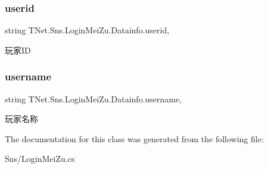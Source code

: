 \subsubsection{\texorpdfstring{userid}{userid}}
{\footnotesize\ttfamily string T\+Net.\+Sns.\+Login\+Mei\+Zu.\+Datainfo.\+userid\hspace{0.3cm}{\ttfamily [get]}, {\ttfamily [set]}}



玩家\+ID 

\mbox{\label{class_t_net_1_1_sns_1_1_login_mei_zu_1_1_datainfo_a3b683b8a9753443d4d4170a15c771e34}} 
\subsubsection{\texorpdfstring{username}{username}}
{\footnotesize\ttfamily string T\+Net.\+Sns.\+Login\+Mei\+Zu.\+Datainfo.\+username\hspace{0.3cm}{\ttfamily [get]}, {\ttfamily [set]}}



玩家名称 



The documentation for this class was generated from the following file\+:\begin{DoxyCompactItemize}
\item 
Sns/Login\+Mei\+Zu.\+cs\end{DoxyCompactItemize}
